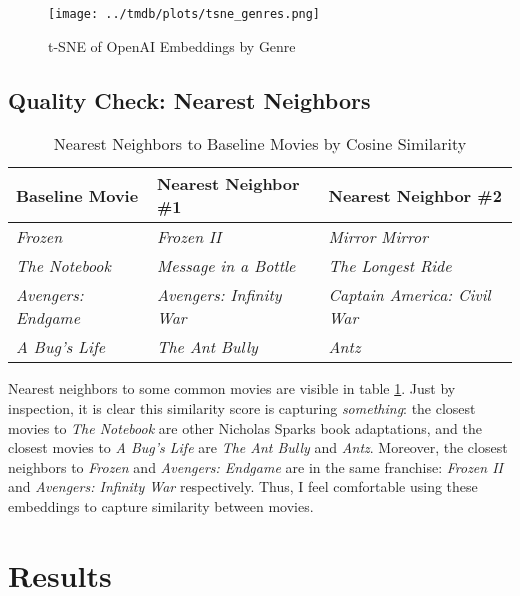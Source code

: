 \documentclass{article}
\begin{document}
\begin{figure}
    \texttt{[image: ../tmdb/plots/tsne\_genres.png]}
    \caption{t-SNE of OpenAI Embeddings by Genre}
    \label{fig:tsne}
\end{figure}


\subsection{Quality Check: Nearest Neighbors}


\begin{table}[]
    \begin{center}
        \begin{tabular}{@{}lll@{}}
        \toprule
        \textbf{Baseline Movie}    & \textbf{Nearest Neighbor \#1}   & \textbf{Nearest Neighbor \#2}       \\ \midrule
        \textit{Frozen}            & \textit{Frozen II}              & \textit{Mirror Mirror}              \\
        \textit{The Notebook}      & \textit{Message in a Bottle}    & \textit{The Longest Ride}           \\
        \textit{Avengers: Endgame} & \textit{Avengers: Infinity War} & \textit{Captain America: Civil War} \\
        \textit{A Bug's Life}      & \textit{The Ant Bully}          & \textit{Antz}                       \\ \bottomrule
        \end{tabular}
        \caption{Nearest Neighbors to Baseline Movies by Cosine Similarity}
        \label{tab:cosine}
    \end{center}
\end{table}

Nearest neighbors to some common movies are visible in table \ref{tab:cosine}. Just by inspection, it is clear this similarity score is capturing \emph{something}: the closest movies to \emph{The Notebook} are other Nicholas Sparks book adaptations, and the closest movies to \emph{A Bug's Life} are \emph{The Ant Bully} and \emph{Antz}. Moreover, the closest neighbors to \emph{Frozen} and \emph{Avengers: Endgame} are in the same franchise: \emph{Frozen II} and \emph{Avengers: Infinity War} respectively. Thus, I feel comfortable using these embeddings to capture similarity between movies.

\section{Results}
\end{document}
